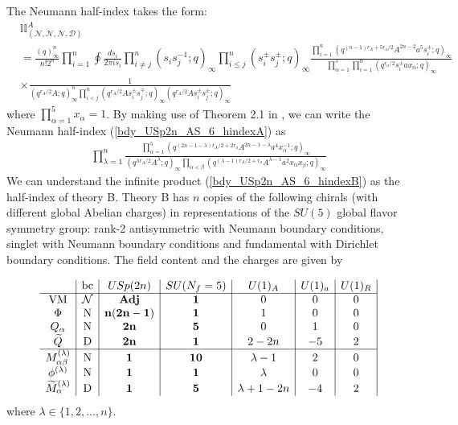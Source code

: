 \documentclass[12pt]{article}
\numberwithin{equation}{section}
\begin{document}
The Neumann half-index takes the form: 
\begin{align}
\label{bdy_USp2n_AS_6_hindexA}
&
\mathbb{II}_{(\mathcal{N,N,N,D})}^{A}
\nonumber\\
&=\frac{(q)_{\infty}^n}{n! 2^n} \prod_{i=1}^n \oint \frac{ds_i}{2\pi i s_i}
\prod_{i \ne j}^n (s_i s_j^{-1}; q)_{\infty} \prod_{i \le j}^n (s_i^{\pm} s_j^{\pm}; q)_{\infty}
\frac{\prod_{i = 1}^n (q^{(n-1)r_A+5r_a/2} A^{2n - 2} a^5 s_i^{\pm}; q)_{\infty}}{\prod_{\alpha = 1}^{5} \prod_{i = 1}^n (q^{r_a/2} s_i^{\pm} a x_{\alpha}; q)_{\infty}}
\nonumber \\
& \times \frac{1}{(q^{r_A/2} A; q)_{\infty}^n \prod_{i < j}^n (q^{r_A/2} A s_i^{\pm} s_j^{\mp}; q)_{\infty} (q^{r_A/2} A s_i^{\pm} s_j^{\pm}; q)_{\infty}}
\end{align}
where $\prod_{\alpha = 1}^{5} x_{\alpha} = 1$.
By making use of Theorem 2.1 in \cite{MR1266569}, 
we can write the Neumann half-index (\ref{bdy_USp2n_AS_6_hindexA}) as
\begin{align}
\label{bdy_USp2n_AS_6_hindexB}
\prod_{\lambda = 1}^n \frac{\prod_{\alpha=1}^{5} (q^{(2n - 1 - \lambda)r_A/2 + 2r_a} A^{2n - 1 - \lambda} a^4 x_{\alpha}^{-1}; q)_{\infty}}{(q^{\lambda r_A/2} A^\lambda; q)_{\infty} \prod_{\alpha < \beta} (q^{(\lambda-1)r_A/2 + r_a} A^{\lambda-1} a^2 x_{\alpha} x_{\beta}; q)_{\infty}} 
\end{align}
We can understand the infinite product (\ref{bdy_USp2n_AS_6_hindexB}) as the half-index of theory B. 
Theory B has $n$ copies of the following chirals (with different global Abelian charges) in representations of the $SU(5)$ global flavor symmetry group:
rank-2 antisymmetric with Neumann boundary conditions, singlet with
Neumann boundary conditions and fundamental with Dirichlet boundary conditions. 
The field content and the charges are given by

\begin{align}
\label{USp2n_AS_6_charges}
\begin{array}{c|c|c|c|c|c|c|c|c}
& \textrm{bc} & USp(2n) & SU(N_f = 5) & U(1)_A & U(1)_a & U(1)_R \\ \hline
\textrm{VM} & \mathcal{N} & {\bf Adj} & {\bf 1} & 0 & 0 & 0 \\
\Phi &\textrm{N}& {\bf n(2n-1)} & {\bf 1} & 1 & 0 & 0 \\
Q_{\alpha} & \textrm{N} & {\bf 2n} & {\bf 5} & 0 & 1 & 0 \\
\widetilde{Q} & \textrm{D} & {\bf 2n} & {\bf 1} & 2 - 2n & -5 & 2 \\
 \hline
M_{\alpha \beta}^{(\lambda)} & \textrm{N} & {\bf 1} & {\bf 10} & \lambda-1 & 2 & 0 \\
\phi^{(\lambda)} & \textrm{N} & {\bf 1} & {\bf 1} & \lambda & 0 & 0 \\
\widetilde{M}_{\alpha}^{(\lambda)} & \textrm{D} & {\bf 1} & {\bf 5} & \lambda + 1 - 2n & -4 & 2
\end{array}
\end{align}
where $\lambda \in \{1, 2, \ldots , n\}$.
\end{document}
